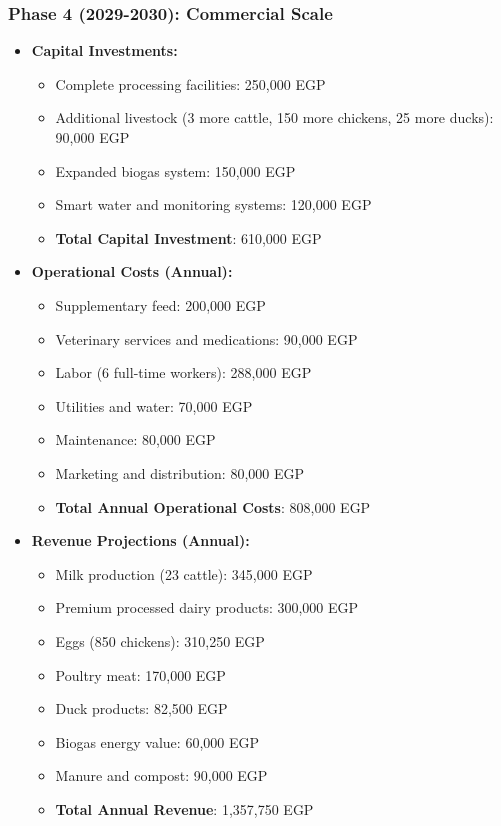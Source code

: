 \subsubsection{Phase 4 (2029-2030): Commercial Scale}
\begin{itemize}
    \item \textbf{Capital Investments:}
    \begin{itemize}
        \item Complete processing facilities: 250,000 EGP
        \item Additional livestock (3 more cattle, 150 more chickens, 25 more ducks): 90,000 EGP
        \item Expanded biogas system: 150,000 EGP
        \item Smart water and monitoring systems: 120,000 EGP
        \item \textbf{Total Capital Investment}: 610,000 EGP
    \end{itemize}
    
    \item \textbf{Operational Costs (Annual):}
    \begin{itemize}
        \item Supplementary feed: 200,000 EGP
        \item Veterinary services and medications: 90,000 EGP
        \item Labor (6 full-time workers): 288,000 EGP
        \item Utilities and water: 70,000 EGP
        \item Maintenance: 80,000 EGP
        \item Marketing and distribution: 80,000 EGP
        \item \textbf{Total Annual Operational Costs}: 808,000 EGP
    \end{itemize}
    
    \item \textbf{Revenue Projections (Annual):}
    \begin{itemize}
        \item Milk production (23 cattle): 345,000 EGP
        \item Premium processed dairy products: 300,000 EGP
        \item Eggs (850 chickens): 310,250 EGP
        \item Poultry meat: 170,000 EGP
        \item Duck products: 82,500 EGP
        \item Biogas energy value: 60,000 EGP
        \item Manure and compost: 90,000 EGP
        \item \textbf{Total Annual Revenue}: 1,357,750 EGP
    \end{itemize}
    

\end{itemize}
